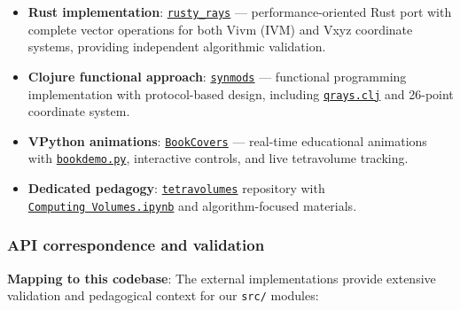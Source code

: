 \documentclass[
]{article}
\begin{document}
\begin{itemize}
\item
  \textbf{Rust implementation}:
  \href{https://github.com/4dsolutions/rusty_rays}{\texttt{rusty\_rays}}
  --- performance-oriented Rust port with complete vector operations for
  both Vivm (IVM) and Vxyz coordinate systems, providing independent
  algorithmic validation.
\item
  \textbf{Clojure functional approach}:
  \href{https://github.com/4dsolutions/synmods}{\texttt{synmods}} ---
  functional programming implementation with protocol-based design,
  including
  \href{https://github.com/4dsolutions/synmods/blob/master/qrays.clj}{\texttt{qrays.clj}}
  and 26-point coordinate system.
\item
  \textbf{VPython animations}:
  \href{https://github.com/4dsolutions/BookCovers}{\texttt{BookCovers}}
  --- real-time educational animations with
  \href{https://github.com/4dsolutions/BookCovers/blob/master/bookdemo.py}{\texttt{bookdemo.py}},
  interactive controls, and live tetravolume tracking.
\item
  \textbf{Dedicated pedagogy}:
  \href{https://github.com/4dsolutions/tetravolumes}{\texttt{tetravolumes}}
  repository with
  \href{https://raw.githubusercontent.com/4dsolutions/tetravolumes/refs/heads/master/Computing\%20Volumes.ipynb}{\texttt{Computing\ Volumes.ipynb}}
  and algorithm-focused materials.
\end{itemize}

\hypertarget{api-correspondence-and-validation}{%
\subsubsection{API correspondence and
validation}\label{api-correspondence-and-validation}}

\textbf{Mapping to this codebase}: The external implementations provide
extensive validation and pedagogical context for our \texttt{src/}
modules:
\end{document}
